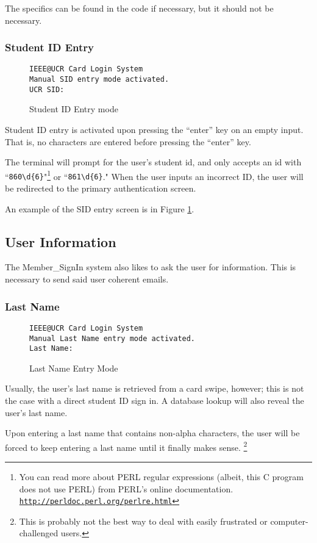 \documentclass[12pt]{article}
\begin{document}
The specifics can be found in the code if necessary, but it should not be
necessary.
\subsubsection{Student ID Entry}
\begin{figure}[h]
{\tt IEEE@UCR Card Login System\\
Manual SID entry mode activated.\\
UCR SID: 
}
\caption{Student ID Entry mode}
\label{fig:sidauth}
\end{figure}
Student ID entry is activated upon pressing the ``enter'' \Return key on an 
empty input.  That is, no characters are entered before pressing the ``enter''
\Return key.

The terminal will prompt for the user's student id, and only accepts an id
with ``{\tt860\textbackslash d\{6\}}"\footnote{You can read more about PERL
regular
 expressions (albeit, this C program does not use PERL) from PERL's online
 documentation. {\tt\url{http://perldoc.perl.org/perlre.html}}
} or ``{\tt861\textbackslash d\{6\}}."  When the user inputs an incorrect ID,
the user will be redirected to the primary authentication screen.

An example of the SID entry screen is in Figure \ref{fig:sidauth}.
\subsection{User Information}
The Member\_SignIn system also likes to ask the user for information.  This is
necessary to send said user coherent emails.
\subsubsection{Last Name}
\begin{figure}[h]
{\tt IEEE@UCR Card Login System\\
Manual Last Name entry mode activated.\\
Last Name:}
\caption{Last Name Entry Mode}
\label{fig:lname}
\end{figure}
Usually, the user's last name is retrieved from a card swipe, however; this is
not the case with a direct student ID sign in.  A database lookup will also
reveal the user's last name.

Upon entering a last name that contains non-alpha characters, the user will be
forced to keep entering a last name until it finally makes sense.
\footnote{This is probably not the best way to deal with easily frustrated
or computer-challenged users.}
\end{document}
